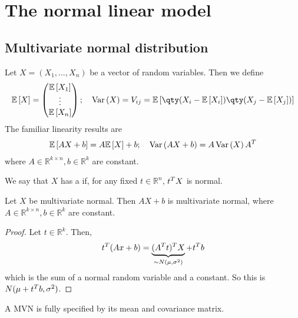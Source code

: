 \section{The normal linear model}

\subsection{Multivariate normal distribution}
Let $X = (X_1, \dots, X_n)$ be a vector of random variables.
Then we define
\begin{align*}
	\expect{X} = \begin{pmatrix}
		\expect{X_1} \\
		\vdots       \\
		\expect{X_n}
	\end{pmatrix};\quad \Var{X} = V_{ij} = \expect{\qty(X_i - \expect{X_i})\qty(X_j - \expect{X_j})}
\end{align*}
The familiar linearity results are
\begin{align*}
	\mathbb{E}\left[{AX+b}\right] = A\mathbb{E}\left[{X}\right] + b;\quad \operatorname{Var}\left({AX + b}\right) = A \operatorname{Var}\left({X}\right) A^T
\end{align*}
where $A \in \mathbb R^{k \times n}, b \in \mathbb R^k$ are constant.

\begin{definition}
	We say that $X$ has a  if, for any fixed $t \in \mathbb R^n$, $t^T X$ is normal.
\end{definition}

\begin{proposition}
	Let $X$ be multivariate normal.
	Then $AX+b$ is multivariate normal, where $A \in \mathbb R^{k \times n}, b \in \mathbb R^k$ are constant.
\end{proposition}

\begin{proof}
	Let $t \in \mathbb R^k$.
	Then,
	\begin{align*}
		t^T (Ax+b) = \underbrace{(A^T t)^T X}_{\sim N(\mu, \sigma^2)} + t^T b
	\end{align*}
	which is the sum of a normal random variable and a constant.
	So this is $N(\mu + t^T b, \sigma^2)$.
\end{proof}

\begin{proposition}
	A MVN is fully specified by its mean and covariance matrix.
\end{proposition}


